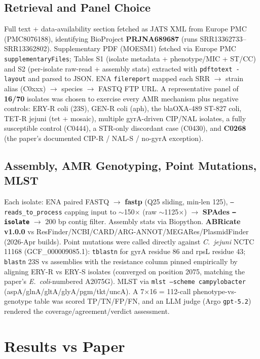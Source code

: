 \documentclass[11pt,a4paper]{article}
\begin{document}
\subsection{Retrieval and Panel Choice}
Full text + data-availability section fetched as JATS XML from Europe PMC (PMC8076188), identifying BioProject \textbf{PRJNA689687} (runs SRR13362733--SRR13362802). Supplementary PDF (MOESM1) fetched via Europe PMC \texttt{supplementaryFiles}; Tables S1 (isolate metadata + phenotype/MIC + ST/CC) and S2 (per-isolate raw-read + assembly stats) extracted with \texttt{pdftotext -layout} and parsed to JSON. ENA \texttt{filereport} mapped each SRR $\to$ strain alias (C0xxx) $\to$ species $\to$ FASTQ FTP URL. A representative panel of \textbf{16/70} isolates was chosen to exercise every AMR mechanism plus negative controls: ERY-R coli (23S), GEN-R coli (aph), the blaOXA-489 ST-827 coli, TET-R jejuni (tet + mosaic), multiple gyrA-driven CIP/NAL isolates, a fully susceptible control (C0444), a STR-only discordant case (C0430), and \textbf{C0268} (the paper's documented CIP-R / NAL-S / no-gyrA exception).

\subsection{Assembly, AMR Genotyping, Point Mutations, MLST}
Each isolate: ENA paired FASTQ $\to$ \textbf{fastp} (Q25 sliding, min-len 125), \texttt{--reads\_to\_process} capping input to $\sim$150$\times$ (raw $\sim$1125$\times$) $\to$ \textbf{SPAdes \texttt{--isolate}} $\to$ 200 bp contig filter. Assembly stats via Biopython. \textbf{ABRicate v1.0.0} vs ResFinder/NCBI/CARD/ARG-ANNOT/MEGARes/PlasmidFinder (2026-Apr builds). Point mutations were called directly against \textit{C.\ jejuni} NCTC 11168 (GCF\_000009085.1): \texttt{tblastn} for gyrA residue 86 and rpsL residue 43; \texttt{blastn} 23S vs assemblies with the resistance column pinned empirically by aligning ERY-R vs ERY-S isolates (converged on position 2075, matching the paper's \textit{E.\ coli}-numbered A2075G). MLST via \texttt{mlst --scheme campylobacter} (aspA/glnA/gltA/glyA/pgm/tkt/uncA). A 7$\times$16 = 112-call phenotype-vs-genotype table was scored TP/TN/FP/FN, and an LLM judge (Argo \texttt{gpt-5.2}) rendered the coverage/agreement/verdict assessment.

\section{Results vs Paper}
\end{document}

